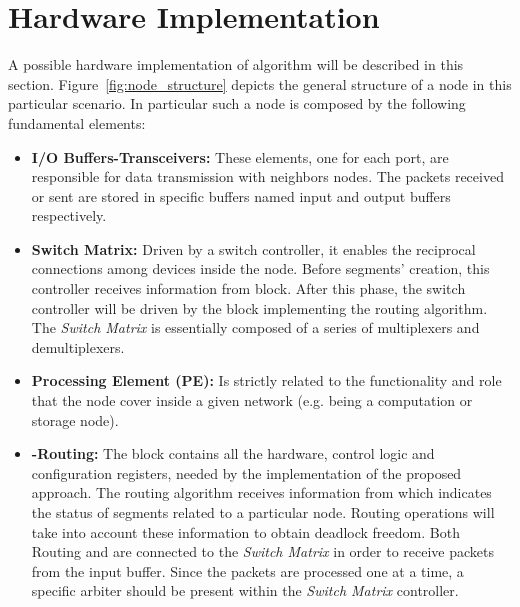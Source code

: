 \section{Hardware Implementation}
\label{sec:implementation}

A possible hardware implementation of \disr{} algorithm will be
described in this section. Figure~\ref{fig:node_structure} depicts the general
structure of a node in this particular scenario. In particular such a node
is composed by the following fundamental elements:

\begin{itemize}%

	\item \textbf{I/O Buffers-Transceivers:} These elements, one for
	each port,  are responsible for data transmission with neighbors
	nodes. The packets received or sent are stored in specific buffers
	named input and output buffers respectively.

	\item \textbf{Switch Matrix:} Driven by a switch controller, it enables the
	reciprocal connections among devices inside the node. Before segments'
	creation, this controller receives information from
	\disr{} block. After this phase, the switch controller will be driven by
	the block implementing the routing algorithm. The \emph{Switch Matrix} is
	essentially composed of a series of multiplexers and demultiplexers.

	\item  \textbf{Processing Element (PE):} Is strictly related to the
	functionality and role that the node cover inside a given network (e.g. being a
	computation or storage node).

	\item \textbf{\disr{}-Routing:} The \disr{} block contains all the hardware, control
	logic and configuration registers, needed by the implementation of the
	proposed approach. The routing algorithm receives information
	from \disr{}  which indicates the status of segments related to a
	particular node. Routing operations will take into account these
	information to obtain deadlock freedom. Both Routing
	and \disr{} are connected to the \emph{Switch Matrix} in order to receive
	packets from the input buffer. Since the packets are processed one at
	a time, a specific arbiter should be present within the \emph{Switch Matrix}
	controller. 

\end{itemize}%

